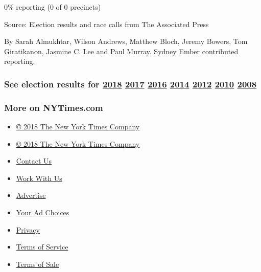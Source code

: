 0\% reporting (0 of 0 precincts)

Source: Election results and race calls from The Associated Press

By Sarah Almukhtar, Wilson Andrews, Matthew Bloch, Jeremy Bowers, Tom
Giratikanon, Jasmine C. Lee and Paul Murray. Sydney Ember contributed
reporting.

\hypertarget{see-election-results-for-2018-2017-2016-2014-2012-2010-2008}{%
\subsubsection{\texorpdfstring{See election results for
\href{https://www.nytimes3xbfgragh.onion/interactive/2018/us/elections/calendar-primary-results.html}{2018}
\href{https://www.nytimes3xbfgragh.onion/interactive/2017/us/elections/election-calendar.html}{2017}
\href{https://www.nytimes3xbfgragh.onion/elections/results/president}{2016}
\href{https://www.nytimes3xbfgragh.onion/elections/2014/results/senate}{2014}
\href{https://www.nytimes3xbfgragh.onion/elections/2012/results/president.html}{2012}
\href{https://www.nytimes3xbfgragh.onion/elections/2010/results/senate.html}{2010}
\href{https://www.nytimes3xbfgragh.onion/elections/2008/results/president/map.html}{2008}}{See election results for 2018 2017 2016 2014 2012 2010 2008}}\label{see-election-results-for-2018-2017-2016-2014-2012-2010-2008}}

\hypertarget{more-on-nytimescom}{%
\subsubsection{More on NYTimes.com}\label{more-on-nytimescom}}

\begin{itemize}
\tightlist
\item
  \href{http://www.nytco.com}{© 2018 The New York Times Company}
\end{itemize}

\begin{itemize}
\tightlist
\item
  \href{http://www.nytco.com}{© 2018 The New York Times Company}
\item
  \href{http://www.nytimes3xbfgragh.onion/ref/membercenter/help/infoservdirectory.html}{Contact
  Us}
\item
  \href{http://www.nytco.com/careers}{Work With Us}
\item
  \href{http://www.nytimes.whsites.net/mediakit}{Advertise}
\item
  \href{http://www.nytimes3xbfgragh.onion/content/help/rights/privacy/policy/privacy-policy.html\#pp}{Your
  Ad Choices}
\item
  \href{http://www.nytimes3xbfgragh.onion/privacy}{Privacy}
\item
  \href{http://www.nytimes3xbfgragh.onion/ref/membercenter/help/agree.html}{Terms
  of Service}
\item
  \href{http://www.nytimes3xbfgragh.onion/content/help/rights/sale/terms-of-sale.html}{Terms
  of Sale}
\end{itemize}

